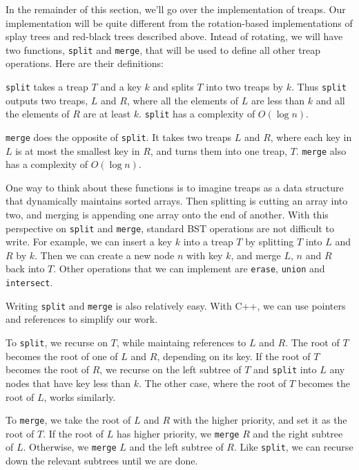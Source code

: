 In the remainder of this section, we'll go over the implementation of treaps. Our implementation will be quite different from the rotation-based implementations of splay trees and red-black trees described above. Intead of rotating, we will have two functions, \texttt{split} and \texttt{merge}, that will be used to define all other treap operations. Here are their definitions:

\texttt{split} takes a treap $T$ and a key $k$ and splits $T$ into two treaps by $k$. Thus \texttt{split} outputs two treaps, $L$ and $R$, where all the elements of $L$ are less than $k$ and all the elements of $R$ are at least $k$. \texttt{split} has a complexity of $O(\log n)$.

\texttt{merge} does the opposite of \texttt{split}. It takes two treaps $L$ and $R$, where each key in $L$ is at most the smallest key in $R$, and turns them into one treap, $T$. \texttt{merge} also has a complexity of $O(\log n)$.

One way to think about these functions is to imagine treaps as a data structure that dynamically maintains sorted arrays. Then splitting is cutting an array into two, and merging is appending one array onto the end of another. With this perspective on \texttt{split} and \texttt{merge}, standard BST operations are not difficult to write. For example, we can insert a key $k$ into a treap $T$ by splitting $T$ into $L$ and $R$ by $k$. Then we can create a new node $n$ with key $k$, and merge $L$, $n$ and $R$ back into $T$. Other operations that we can implement are \texttt{erase}, \texttt{union} and \texttt{intersect}. 

Writing \texttt{split} and \texttt{merge} is also relatively easy. With C++, we can use pointers and references to simplify our work.

To \texttt{split}, we recurse on $T$, while maintaing references to $L$ and $R$. The root of $T$ becomes the root of one of $L$ and $R$, depending on its key. If the root of $T$ becomes the root of $R$, we recurse on the left subtree of $T$ and \texttt{split} into $L$ any nodes that have key less than $k$. The other case, where the root of $T$ becomes the root of $L$, works similarly.

To \texttt{merge}, we take the root of $L$ and $R$ with the higher priority, and set it as the root of $T$. If the root of $L$ has higher priority, we \texttt{merge} $R$ and the right subtree of $L$. Otherwise, we \texttt{merge} $L$ and the left subtree of $R$. Like \texttt{split}, we can recurse down the relevant subtrees until we are done.

